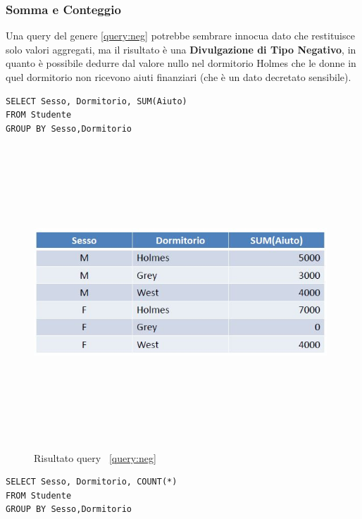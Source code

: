 \subsubsection{Somma e Conteggio}

Una query del genere \ref{query:neg} potrebbe sembrare innocua dato che restituisce solo valori aggregati, ma il risultato è una \textbf{Divulgazione di Tipo Negativo}, in quanto è possibile dedurre dal valore nullo nel dormitorio Holmes che le donne in quel dormitorio non ricevono aiuti finanziari (che è un dato decretato sensibile). 

\begin{algorithm} 
\begin{lstlisting}[caption={Query che implementa un attacco con somma per ottenere Divulgazione di tipo negativo \label{query:neg}}] 
SELECT Sesso, Dormitorio, SUM(Aiuto)
FROM Studente
GROUP BY Sesso,Dormitorio
\end{lstlisting}
\end{algorithm}

\begin{figure}[htbp]
	\centering				
		{\includegraphics[height=11cm, width=11cm, keepaspectratio]{Immagini/dati_sensibili/prot_dati_09.JPG}}
							\caption{Risultato query ~\ref{query:neg} \label{fig:query_indiretta_result}}                         
\end{figure}

\begin{algorithm}
\begin{lstlisting}[caption={Query che implementa un attacco con conteggio \label{query:count}}] 
SELECT Sesso, Dormitorio, COUNT(*)
FROM Studente
GROUP BY Sesso,Dormitorio
\end{lstlisting}
\end{algorithm}

